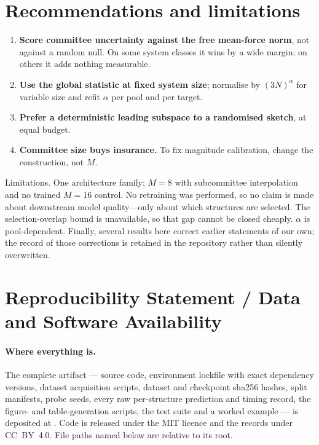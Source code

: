 \section{Recommendations and limitations}

\begin{enumerate}
\item \textbf{Score committee uncertainty against the free mean-force norm}, not
against a random null. On some system classes it wins by a wide margin; on others
it adds nothing measurable.
\item \textbf{Use the global statistic at fixed system size}; normalise by
$(3N)^{\alpha}$ for variable size and refit $\alpha$ per pool and per target.
\item \textbf{Prefer a deterministic leading subspace to a randomised sketch}, at
equal budget.
\item \textbf{Committee size buys insurance.} To fix magnitude calibration,
change the construction, not $M$.
\end{enumerate}

Limitations. One architecture family; $M=8$ with subcommittee interpolation and
no trained $M=16$ control. No retraining was performed, so no claim is made about
downstream model quality---only about which structures are selected. The
selection-overlap bound is unavailable, so that gap cannot be closed cheaply.
$\alpha$ is pool-dependent. Finally, several results here correct earlier
statements of our own; the record of those corrections is retained in the
repository rather than silently overwritten.

\section*{Reproducibility Statement / Data and Software Availability}
\label{sec:avail}

\paragraph{Where everything is.}
The complete artifact --- source code, environment lockfile with exact dependency
versions, dataset acquisition scripts, dataset and checkpoint sha256 hashes, split
manifests, probe seeds, every raw per-structure prediction and timing record, the
figure- and table-generation scripts, the test suite and a worked example ---
is deposited at \fsArtifactLink. Code is released under the MIT licence and the
records under CC~BY~4.0. File paths named below are relative to its root.

